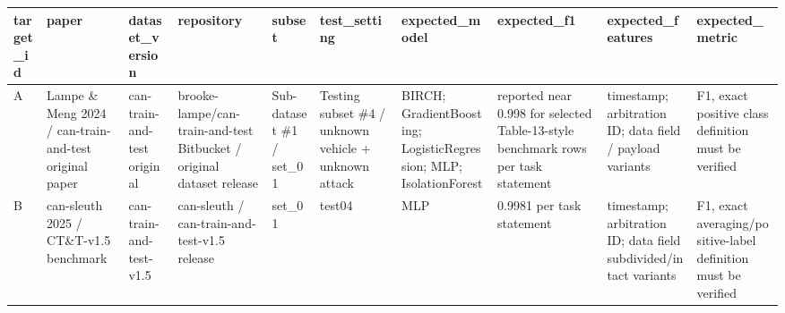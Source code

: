 \begin{tabular}{llllllllll}
\toprule
target\_id & paper & dataset\_version & repository & subset & test\_setting & expected\_model & expected\_f1 & expected\_features & expected\_metric \\
\midrule
A & Lampe \& Meng 2024 / can-train-and-test original paper & can-train-and-test original & brooke-lampe/can-train-and-test Bitbucket / original dataset release & Sub-dataset \#1 / set\_01 & Testing subset \#4 / unknown vehicle + unknown attack & BIRCH; GradientBoosting; LogisticRegression; MLP; IsolationForest & reported near 0.998 for selected Table-13-style benchmark rows per task statement & timestamp; arbitration ID; data field / payload variants & F1, exact positive class definition must be verified \\
B & can-sleuth 2025 / CT\&T-v1.5 benchmark & can-train-and-test-v1.5 & can-sleuth / can-train-and-test-v1.5 release & set\_01 & test04 & MLP & 0.9981 per task statement & timestamp; arbitration ID; data field subdivided/intact variants & F1, exact averaging/positive-label definition must be verified \\
\bottomrule
\end{tabular}
